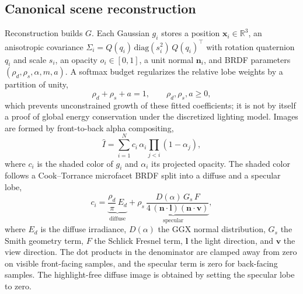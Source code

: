 \documentclass[smallextended]{svjour3}
\begin{document}
\subsection{Canonical scene reconstruction}
\label{sec:tier1}
Reconstruction builds $G$. Each Gaussian $g_i$ stores a position
$\mathbf{x}_i \in \mathbb{R}^3$, an anisotropic covariance
$\Sigma_i = Q(q_i)\,\mathrm{diag}(s_i^2)\,Q(q_i)^{\top}$ with rotation
quaternion $q_i$ and scale $s_i$, an opacity $o_i \in [0,1]$, a unit normal
$\mathbf{n}_i$, and BRDF parameters $(\rho_d, \rho_s, \alpha, m, a)$. A
softmax budget regularizes the relative lobe weights by a partition of
unity,
\begin{equation}
\rho_d + \rho_s + a = 1, \qquad \rho_d,\rho_s,a \ge 0,
\label{eq:budget}
\end{equation}
which prevents unconstrained growth of these fitted coefficients; it is
not by itself a proof of global energy conservation under the discretized
lighting model. Images are formed by front-to-back alpha compositing,
\begin{equation}
\hat{I} = \sum_{i=1}^{N} c_i\,\alpha_i \prod_{j<i}(1-\alpha_j),
\label{eq:render}
\end{equation}
where $c_i$ is the shaded color of $g_i$ and $\alpha_i$ its projected
opacity. The shaded color follows a Cook--Torrance microfacet BRDF
\cite{cooktorrance} split into a diffuse and a specular lobe,
\begin{equation}
c_i = \underbrace{\frac{\rho_d}{\pi}\,E_d}_{\text{diffuse}}
+ \underbrace{\rho_s\,\frac{D(\alpha)\,G_s\,F}{4\,(\mathbf{n}\cdot\mathbf{l})(\mathbf{n}\cdot\mathbf{v})}}_{\text{specular}},
\label{eq:cooktorrance}
\end{equation}
where $E_d$ is the diffuse irradiance, $D(\alpha)$ the GGX normal
distribution, $G_s$ the Smith geometry term, $F$ the Schlick Fresnel term,
$\mathbf{l}$ the light direction, and $\mathbf{v}$ the view direction. The
dot products in the denominator are clamped away from zero on visible
front-facing samples, and the specular term is zero for back-facing
samples. The
highlight-free diffuse image is obtained by setting the specular lobe to
zero.
\end{document}
